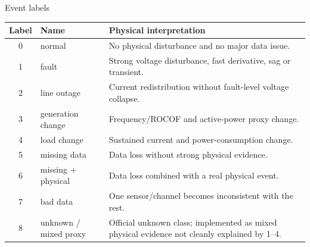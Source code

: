 ﻿\documentclass[10pt,aspectratio=169]{beamer}
\begin{document}
\begin{frame}{Event labels}
\small
\centering
\begin{tabular}{clp{}}
\toprule
\textbf{Label} & \textbf{Name} & \textbf{Physical interpretation}\\
\midrule
0 & normal & No physical disturbance and no major data issue.\\
1 & fault & Strong voltage disturbance, fast derivative, sag or transient.\\
2 & line outage & Current redistribution without fault-level voltage collapse.\\
3 & generation change & Frequency/ROCOF and active-power proxy change.\\
4 & load change & Sustained current and power-consumption change.\\
5 & missing data & Data loss without strong physical evidence.\\
6 & missing + physical & Data loss combined with a real physical event.\\
7 & bad data & One sensor/channel becomes inconsistent with the rest.\\
8 & unknown / mixed proxy & Official unknown class; implemented as mixed physical evidence not cleanly explained by 1--4.\\
\bottomrule
\end{tabular}
\end{frame}
\end{document}
